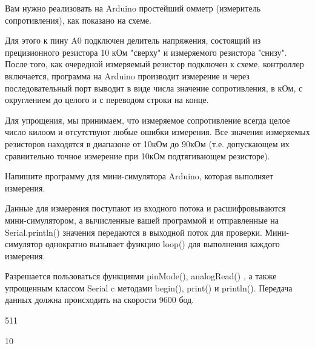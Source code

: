 
Вам нужно реализовать на Arduino простейший омметр (измеритель сопротивления), как показано на схеме. 


Для этого к пину A0 подключен делитель напряжения, состоящий из прецизионного резистора 10 кОм "сверху" и измеряемого резистора "снизу".  После того, как очередной измеряемый резистор подключен к схеме, контроллер включается, программа на Arduino производит измерение и через последовательный порт выводит в виде числа значение сопротивления, в кОм, с округлением до целого и с переводом строки на конце.   

Для упрощения,  мы принимаем, что измеряемое сопротивление всегда целое число килоом и отсутствуют любые ошибки измерения. Все значения измеряемых резисторов находятся в диапазоне от 10кОм до 90кОм (т.е. допускающем их сравнительно точное измерение при 10кОм подтягивающем резисторе).


Напишите программу для мини-симулятора Arduino, которая выполняет измерения.

Данные для измерения поступают из входного потока и расшифровываются мини-симулятором, а вычисленные вашей программой и отправленные на Serial.println() значения передаются в выходной поток для проверки.  Мини-симулятор однократно вызывает функцию loop() для выполнения каждого измерения. 

Разрешается пользоваться функциями pinMode(), analogRead() ,  а также упрощенным классом Serial c методами begin(), print() и println().  Передача данных должна происходить на скорости 9600 бод.

\begin{myverbbox}[\small]{\vinput}
    511
\end{myverbbox}
\begin{myverbbox}[\small]{\voutput}
    10
\end{myverbbox}

